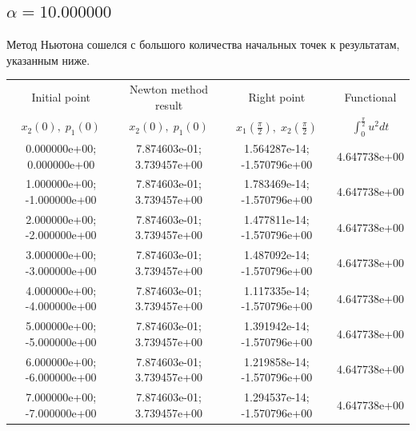 \documentclass[titlepage]{article}
\def\l{\left}
\def\r{\right}
\begin{document}
\subsection{$\alpha = 10.000000$} 
Метод Ньютона сошелся с большого количества начальных точек к результатам, указанным ниже. \\ 
\begin{tabular}{ | c | c | c | c |} 
\hline 
Initial point  & Newton method result & Right point & Functional 
 \\ $x_2(0), \; p_1(0)$ & $x_2(0), \; p_1(0)$ & $x_1\l(\frac{\pi}{2}\r), \; x_2\l(\frac{\pi}{2}\r)$ & $\int_{0}^{\frac{\pi}{2}}u^2dt$  \\ \hline 
0.000000e+00; 0.000000e+00 & 7.874603e-01; 3.739457e+00 & 1.564287e-14; -1.570796e+00 & 4.647738e+00 \\ \hline 
1.000000e+00; -1.000000e+00 & 7.874603e-01; 3.739457e+00 & 1.783469e-14; -1.570796e+00 & 4.647738e+00 \\ \hline 
2.000000e+00; -2.000000e+00 & 7.874603e-01; 3.739457e+00 & 1.477811e-14; -1.570796e+00 & 4.647738e+00 \\ \hline 
3.000000e+00; -3.000000e+00 & 7.874603e-01; 3.739457e+00 & 1.487092e-14; -1.570796e+00 & 4.647738e+00 \\ \hline 
4.000000e+00; -4.000000e+00 & 7.874603e-01; 3.739457e+00 & 1.117335e-14; -1.570796e+00 & 4.647738e+00 \\ \hline 
5.000000e+00; -5.000000e+00 & 7.874603e-01; 3.739457e+00 & 1.391942e-14; -1.570796e+00 & 4.647738e+00 \\ \hline 
6.000000e+00; -6.000000e+00 & 7.874603e-01; 3.739457e+00 & 1.219858e-14; -1.570796e+00 & 4.647738e+00 \\ \hline 
7.000000e+00; -7.000000e+00 & 7.874603e-01; 3.739457e+00 & 1.294537e-14; -1.570796e+00 & 4.647738e+00 \\ \hline 
\end{tabular} 
\end{document}
